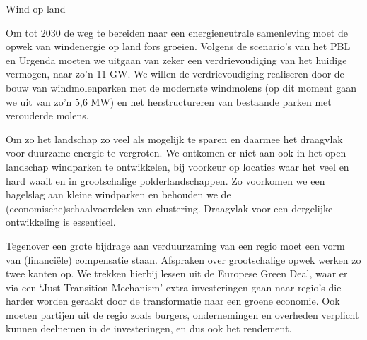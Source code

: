 \begin{voorstel}{Wind op land}
\begin{multicols}{2}
\begin{overwegingen}
\end{overwegingen}

\begin{aanbevelingen-start}
Om tot 2030 de weg te bereiden naar een energieneutrale samenleving moet de opwek van windenergie op land fors groeien. Volgens de scenario’s van het PBL en Urgenda moeten we uitgaan van zeker een verdrievoudiging van het huidige vermogen, naar zo’n 11 GW. We willen de verdrievoudiging realiseren door de bouw van windmolenparken met de modernste windmolens (op dit moment gaan we uit van zo’n 5,6 MW) en het herstructureren van bestaande parken met verouderde molens.

Om zo het landschap zo veel als mogelijk te sparen en daarmee het draagvlak voor duurzame energie te vergroten. We ontkomen er niet aan ook in het open landschap windparken te ontwikkelen, bij voorkeur op locaties waar het veel en hard waait en in grootschalige polderlandschappen. Zo voorkomen we een hagelslag aan kleine windparken en behouden we de (economische)schaalvoordelen van clustering. Draagvlak voor een dergelijke ontwikkeling is essentieel.

Tegenover een grote bijdrage aan verduurzaming van een regio moet een vorm van (financiële) compensatie staan. Afspraken over grootschalige opwek werken zo twee kanten op. We trekken hierbij lessen uit de Europese Green Deal, waar er via een ‘Just Transition Mechanism’ extra investeringen gaan naar regio’s die harder worden geraakt door de transformatie naar een groene economie. Ook moeten partijen uit de regio zoals burgers, ondernemingen en overheden verplicht kunnen deelnemen in de investeringen, en dus ook het rendement.
\end{aanbevelingen-start}


\end{multicols}
\end{voorstel}
